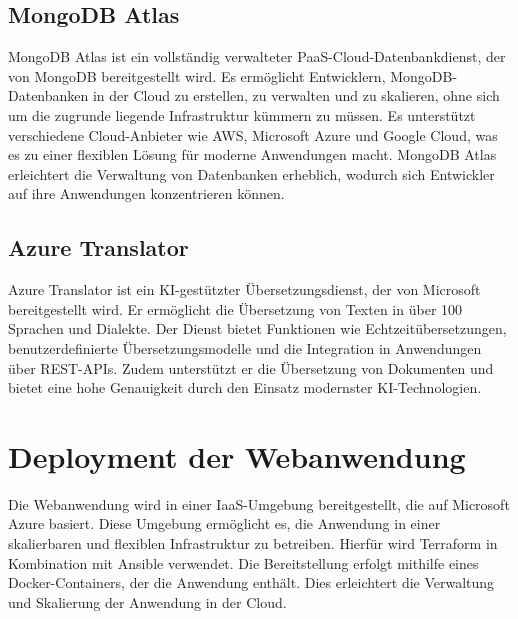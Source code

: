 \subsection{MongoDB Atlas}\label{c:2_ss:mongodb}
MongoDB Atlas ist ein vollständig verwalteter \ac{PaaS}-Cloud-Datenbankdienst, der von MongoDB bereitgestellt wird. Es ermöglicht Entwicklern, MongoDB-Datenbanken in der Cloud zu erstellen, zu verwalten und zu skalieren, ohne sich um die zugrunde liegende Infrastruktur kümmern zu müssen. Es unterstützt verschiedene Cloud-Anbieter wie AWS, Microsoft Azure und Google Cloud, was es zu einer flexiblen Lösung für moderne Anwendungen macht. MongoDB Atlas erleichtert die Verwaltung von Datenbanken erheblich, wodurch sich Entwickler auf ihre Anwendungen konzentrieren können.
\cite{mongodb}

\subsection{Azure Translator}\label{c:2_ss:azure-translator}
Azure Translator ist ein KI-gestützter Übersetzungsdienst, der von Microsoft bereitgestellt wird. Er ermöglicht die Übersetzung von Texten in über 100 Sprachen und Dialekte. Der Dienst bietet Funktionen wie Echtzeitübersetzungen, benutzerdefinierte Übersetzungsmodelle und die Integration in Anwendungen über REST-APIs. Zudem unterstützt er die Übersetzung von Dokumenten und bietet eine hohe Genauigkeit durch den Einsatz modernster KI-Technologien.
\cite{azure-translator}


\section{Deployment der Webanwendung}\label{c:2_s:deploy-webapp}

Die Webanwendung wird in einer \ac{IaaS}-Umgebung bereitgestellt, die auf Microsoft Azure basiert. Diese Umgebung ermöglicht es, die Anwendung in einer skalierbaren und flexiblen Infrastruktur zu betreiben. Hierfür wird Terraform in Kombination mit Ansible verwendet. Die Bereitstellung erfolgt mithilfe eines Docker-Containers, der die Anwendung enthält. Dies erleichtert die Verwaltung und Skalierung der Anwendung in der Cloud.


